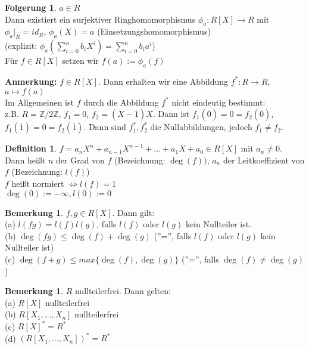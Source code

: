 \documentclass[10pt,a4paper,numbers=endperiod]{scrreprt}
\theoremstyle{definition}
\newtheorem{defi}[satz]{Definition}
\newtheorem{bem}[satz]{Bemerkung}
\newtheorem{folg}[satz]{Folgerung}
\def\ZZ{{\mathbb Z}}
\begin{document}
\begin{folg}
	$a \in R$\\
	Dann existiert ein surjektiver Ringhomomorphismus $\phi_a: R[X] \rightarrow R$ mit $\phi_a|_R = id_R$, $\phi_a(X) = a$ (Einsetzungshomomorphismus)\\
	(explizit: $\phi_a(\sum\limits_{i = 0}^n b_iX^i) = \sum\limits_{i = 0}^n b_ia^i$)\\
	Für $f \in R[X]$ setzen wir $f(a) := \phi_a(f)$
\end{folg}

\textbf{Anmerkung:} $f \in R[X]$. Dann erhalten wir eine Abbildung $f^*: R \rightarrow R$, $a \mapsto f(a)$\\
Im Allgemeinen ist $f$ durch die Abbildung $f^*$ nicht eindeutig bestimmt:\\
z.B. $R = \ZZ/2\ZZ$, $f_1 = 0$, $f_2 = (X-\overline{1})X$. Dann ist $f_1(\overline{0}) = \overline{0} = f_2(\overline{0})$, $f_1(\overline{1}) = \overline{0} = f_2(\overline{1})$. Dann sind $f_1^*, f_2^*$ die Nullabbildungen, jedoch $f_1 \neq f_2$.

\begin{defi}
	$f = a_nX^n + a_{n-1}X^{n-1} + \ldots + a_1X + a_0 \in R[X]$ mit $a_n \neq 0$.\\
	Dann heißt $n$ der Grad von $f$ (Bezeichnung: $\deg(f))$, $a_n$ der Leitkoeffizient von $f$ (Bezeichnung: $l(f)$)\\
	$f$ heißt normiert $\Leftrightarrow l(f) = 1$\\
	$\deg(0):= - \infty, l(0) := 0$ 
\end{defi}

\begin{bem}
	$f,g \in R[X]$. Dann gilt:\\
	(a) $l(fg) = l(f)l(g)$, falls $l(f)$ oder $l(g)$ kein Nullteiler ist.\\
	(b) $\deg(fg) \leq \deg(f) + \deg(g)$ (''='', falls $l(f)$ oder $l(g)$ kein Nullteiler ist)\\
	(c) $\deg(f+g) \leq max\{\deg(f), \deg(g)\}$ (''='', falls $\deg(f) \neq \deg(g)$) 
\end{bem}

\begin{bem}
	$R$ nullteilerfrei. Dann gelten:\\
	(a) $R[X]$ nullteilerfrei\\
	(b) $R[X_1, \ldots, X_n]$ nullteilerfrei\\
	(c) $R[X]^* = R^*$\\
	(d) $(R[X_1, \ldots, X_n])^* = R^*$
\end{bem}
\end{document}
